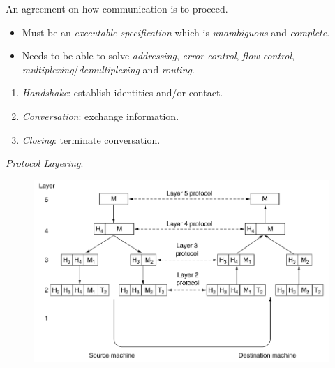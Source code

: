 \documentclass[twocolumn,english]{article}
\begin{document}
An agreement on how communication is to proceed.
\begin{itemize}
\item Must be an \emph{executable specification} which is \emph{unambiguous}
and \emph{complete}.
\item Needs to be able to solve \emph{addressing}, \emph{error control},
\emph{flow control}, \emph{multiplexing}/\emph{demultiplexing} and
\emph{routing}.
\end{itemize}
\begin{enumerate}
\item \emph{Handshake}: establish identities and/or contact.
\item \emph{Conversation}: exchange information.
\item \emph{Closing}: terminate conversation.
\end{enumerate}
\emph{Protocol Layering}:

\begin{figure}[H]
\centering{}\includegraphics[width=0.5\linewidth]{img/protocol-layering}
\end{figure}
\end{document}
